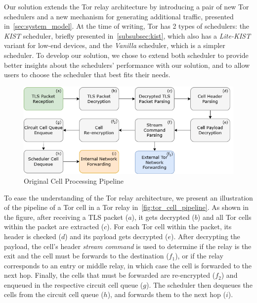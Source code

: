 Our solution extends the Tor relay architecture by introducing a pair of new Tor schedulers and a new mechanism for generating additional traffic, presented in~\autoref{sec:system_model}. 
At the time of writing, Tor has 2 types of schedulers: the \textit{KIST} scheduler, briefly presented in~\autoref{subsubsec:kist}, which also has a \textit{Lite-KIST} variant for low-end devices, and the \textit{Vanilla} scheduler, which is a simpler scheduler. To develop our solution, we chose to extend both scheduler to provide better insights about the schedulers' performance with our solution, and to allow users to choose the scheduler that best fits their needs.

\begin{figure}[!h]
  \centering
  \includegraphics[width=\textwidth]{Chapters/Figures/Tor_Cell_Pipeline.png}
  \caption{Original Cell Processing Pipeline}\label{fig:tor_cell_pipeline}
\end{figure}

To ease the understanding of the Tor relay architecture, we present an  illustration of the pipeline of a Tor cell in a Tor relay in~\autoref{fig:tor_cell_pipeline}. As shown in the figure, after receiving a TLS packet (\(a\)), it gets decrypted (\(b\)) and all Tor cells within the packet are extracted (\(c\)). For each Tor cell within the packet, its header is checked (\(d\))  and its payload gets decrypted (\(e\)). After decrypting the payload, the cell's header \textit{stream command} is used to determine if the relay is the exit and the cell must be forwards to the destination (\(f_1\)), or if the relay corresponds to an entry or middle relay, in which case the cell is forwarded to the next hop. Finally, the cells that must be forwarded are re-encrypted (\(f_2\)) and enqueued in the respective circuit cell queue (\(g\)). The scheduler then dequeues the cells from the circuit cell queue (\(h\)), and forwards them to the next hop (\(i\)).


